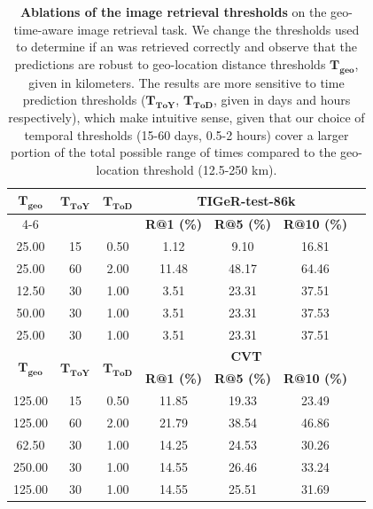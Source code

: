 \begin{table}
    \centering
    \setlength{\tabcolsep}{2pt}
    \renewcommand{\arraystretch}{1.0}
    \caption{\textbf{Ablations of the image retrieval thresholds} on the geo-time-aware image retrieval task. We change the thresholds used to determine if an was retrieved correctly and observe that the predictions are robust to geo-location distance thresholds $\mathbf{T_{geo}}$, given in kilometers. The results are more sensitive to time prediction thresholds ($\mathbf{T_{ToY}}$, $\mathbf{T_{ToD}}$, given in days and hours respectively), which make intuitive sense, given that our choice of temporal thresholds (15-60 days, 0.5-2 hours) cover a larger portion of the total possible range of times compared to the geo-location threshold (12.5-250 km).}
    \label{tab:ablations-threshold}
    \begin{tabular}{ccccccc} 
        \toprule
        
        \multirow{2}{*}{$\mathbf{T_{geo}}$} & \multirow{2}{*}{$\mathbf{T_{ToY}}$} & \multirow{2}{*}{$\mathbf{T_{ToD}}$} & \multicolumn{3}{c}{\textbf{TIGeR-test-86k}} \\
        \cmidrule(lr){4-6}  
         &  &  & \textbf{R@1 (\%)} & \textbf{R@5 (\%)} & \textbf{R@10 (\%)} \\
        
        \midrule
        
        25.00 & 15 & 0.50 & 1.12 & 9.10 & 16.81 \\
        25.00 & 60 & 2.00 & 11.48 & 48.17 & 64.46 \\
        12.50 & 30 & 1.00 & 3.51 & 23.31 & 37.51 \\
        50.00 & 30 & 1.00 & 3.51 & 23.31 & 37.53 \\
        25.00 & 30 & 1.00 & 3.51 & 23.31 & 37.51 \\

        \midrule

        \multirow{2}{*}{$\mathbf{T_{geo}}$} & \multirow{2}{*}{$\mathbf{T_{ToY}}$} & \multirow{2}{*}{$\mathbf{T_{ToD}}$} & \multicolumn{3}{c}{\textbf{CVT}} \\
        \cmidrule(lr){4-6}
         &  &  & \textbf{R@1 (\%)} & \textbf{R@5 (\%)} & \textbf{R@10 (\%)} \\

        \midrule
        
        125.00 & 15 & 0.50 & 11.85 & 19.33 & 23.49 \\
        125.00 & 60 & 2.00 & 21.79 & 38.54 & 46.86 \\
        62.50 & 30 & 1.00 & 14.25 & 24.53 & 30.26 \\
        250.00 & 30 & 1.00 & 14.55 & 26.46 & 33.24 \\
        125.00 & 30 & 1.00 & 14.55 & 25.51 & 31.69 \\

        \bottomrule
    \end{tabular}
\end{table}

